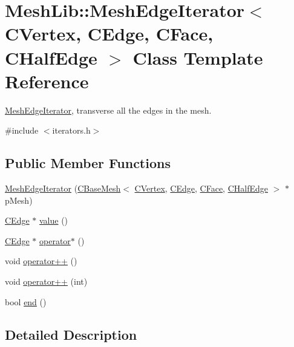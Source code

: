 \hypertarget{class_mesh_lib_1_1_mesh_edge_iterator}{}\section{Mesh\+Lib\+:\+:Mesh\+Edge\+Iterator$<$ C\+Vertex, C\+Edge, C\+Face, C\+Half\+Edge $>$ Class Template Reference}
\label{class_mesh_lib_1_1_mesh_edge_iterator}


\hyperlink{class_mesh_lib_1_1_mesh_edge_iterator}{Mesh\+Edge\+Iterator}, transverse all the edges in the mesh.  




{\ttfamily \#include $<$iterators.\+h$>$}

\subsection*{Public Member Functions}
\begin{DoxyCompactItemize}
\item 
\hyperlink{class_mesh_lib_1_1_mesh_edge_iterator_aca662c1484b2bcc1769475a13969795d}{Mesh\+Edge\+Iterator} (\hyperlink{class_mesh_lib_1_1_c_base_mesh}{C\+Base\+Mesh}$<$ \hyperlink{class_mesh_lib_1_1_c_vertex}{C\+Vertex}, \hyperlink{class_mesh_lib_1_1_c_edge}{C\+Edge}, \hyperlink{class_mesh_lib_1_1_c_face}{C\+Face}, \hyperlink{class_mesh_lib_1_1_c_half_edge}{C\+Half\+Edge} $>$ $\ast$p\+Mesh)
\item 
\hyperlink{class_mesh_lib_1_1_c_edge}{C\+Edge} $\ast$ \hyperlink{class_mesh_lib_1_1_mesh_edge_iterator_adac99d2306e206a5a0d2069fad354d1f}{value} ()
\item 
\hyperlink{class_mesh_lib_1_1_c_edge}{C\+Edge} $\ast$ \hyperlink{class_mesh_lib_1_1_mesh_edge_iterator_ab63ff9aa00814e9e428c6e1e0ed6e33b}{operator$\ast$} ()
\item 
void \hyperlink{class_mesh_lib_1_1_mesh_edge_iterator_a9d16c478e6b770d114e03eed10b2d31e}{operator++} ()
\item 
void \hyperlink{class_mesh_lib_1_1_mesh_edge_iterator_aabd4c9904c21993512fbb1d3c52f7381}{operator++} (int)
\item 
bool \hyperlink{class_mesh_lib_1_1_mesh_edge_iterator_a0ad4b9b11b5d043b944818631f612039}{end} ()
\end{DoxyCompactItemize}


\subsection{Detailed Description}
